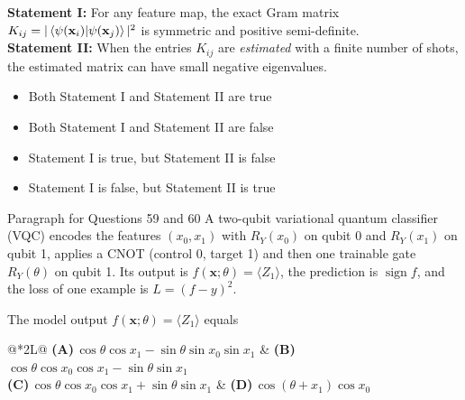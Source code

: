 \documentclass[11pt,a4paper]{article}
\newcommand{\optlabel}[1]{\textbf{(#1)}}
\newenvironment{qitem}[1]{\begin{list}{}{\setlength{\leftmargin}{3.3em}\setlength{\labelwidth}{3.1em}%
  \setlength{\labelsep}{0.2em}\setlength{\topsep}{3pt}\setlength{\parsep}{3pt}}\item[\textbf{Q.#1}\hfill]}{\end{list}}
\newcommand{\qsep}{\par\vspace{2pt}{\color{black!15}\hrule}\vspace{4pt}}
\begin{document}
\begin{qitem}{58}
\textbf{Statement I:} For any feature map, the exact Gram matrix $K_{ij} = |\braket{\psi(\mathbf x_i)|\psi(\mathbf x_j)}|^2$ is
symmetric and positive semi-definite.\\[1mm]
\textbf{Statement II:} When the entries $K_{ij}$ are \emph{estimated} with a finite number of shots, the estimated matrix can have small
negative eigenvalues.
\begin{itemize}[leftmargin=2.6em, labelsep=0.4em, itemsep=2pt, topsep=3pt]
\item[\optlabel{A}] Both Statement I and Statement II are true
\item[\optlabel{B}] Both Statement I and Statement II are false
\item[\optlabel{C}] Statement I is true, but Statement II is false
\item[\optlabel{D}] Statement I is false, but Statement II is true
\end{itemize}
\end{qitem}
\qsep

\begin{passagebox}{Paragraph for Questions 59 and 60}
A two-qubit variational quantum classifier (VQC) encodes the features $(x_0, x_1)$ with $R_Y(x_0)$ on qubit 0 and
$R_Y(x_1)$ on qubit 1, applies a CNOT (control 0, target 1) and then one trainable gate $R_Y(\theta)$ on qubit 1. Its output
is $f(\mathbf x; \theta) = \langle Z_1\rangle$, the prediction is $\operatorname{sign} f$, and the loss of one example is $L = (f - y)^2$.
\begin{center}
\end{center}
\end{passagebox}
\begin{qitem}{59}
The model output $f(\mathbf x; \theta) = \langle Z_1\rangle$ equals
\par\smallskip\noindent\begin{tabularx}{\linewidth}{@{}*{2}{L}@{}}
\optlabel{A}\,$\cos\theta\cos x_1 - \sin\theta\sin x_0\sin x_1$ & \optlabel{B}\,$\cos\theta\cos x_0\cos x_1 - \sin\theta\sin x_1$ \\[3pt]
\optlabel{C}\,$\cos\theta\cos x_0\cos x_1 + \sin\theta\sin x_1$ & \optlabel{D}\,$\cos(\theta + x_1)\cos x_0$
\end{tabularx}
\end{qitem}
\qsep
\end{document}
